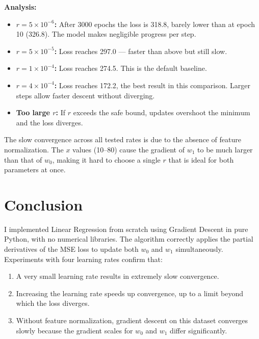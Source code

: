 \documentclass[12pt,a4paper]{article}
\begin{document}
\textbf{Analysis:}
\begin{itemize}
    \item \textbf{$r = 5\times10^{-6}$:} After 3000 epochs the loss is 318.8, barely lower than at epoch 10 (326.8). The model makes negligible progress per step.
    \item \textbf{$r = 5\times10^{-5}$:} Loss reaches 297.0 --- faster than above but still slow.
    \item \textbf{$r = 1\times10^{-4}$:} Loss reaches 274.5. This is the default baseline.
    \item \textbf{$r = 4\times10^{-4}$:} Loss reaches 172.2, the best result in this comparison. Larger steps allow faster descent without diverging.
    \item \textbf{Too large $r$:} If $r$ exceeds the safe bound, updates overshoot the minimum and the loss diverges.
\end{itemize}

The slow convergence across all tested rates is due to the absence of feature normalization. The $x$ values (10--80) cause the gradient of $w_1$ to be much larger than that of $w_0$, making it hard to choose a single $r$ that is ideal for both parameters at once.

\section{Conclusion}

I implemented Linear Regression from scratch using Gradient Descent in pure Python, with no numerical libraries. The algorithm correctly applies the partial derivatives of the MSE loss to update both $w_0$ and $w_1$ simultaneously. Experiments with four learning rates confirm that:
\begin{enumerate}
    \item A very small learning rate results in extremely slow convergence.
    \item Increasing the learning rate speeds up convergence, up to a limit beyond which the loss diverges.
    \item Without feature normalization, gradient descent on this dataset converges slowly because the gradient scales for $w_0$ and $w_1$ differ significantly.
\end{enumerate}
\end{document}
